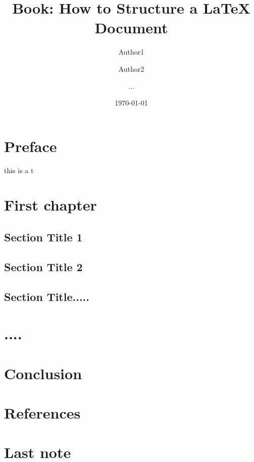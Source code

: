 \documentclass[11pt,a4paper]{book}
\begin{document}
\title{Book: How to Structure a LaTeX Document}
\author{Author1 \and Author2 \and ...}
\date{\today}

\maketitle

\frontmatter

\chapter{Preface}
this is a t
\mainmatter
\chapter{First chapter}
\section{Section Title 1}
\section{Section Title 2}
\section{Section Title.....}

\chapter{....}

\chapter{Conclusion}

\chapter*{References}


\backmatter
\chapter{Last note}
\end{document}
